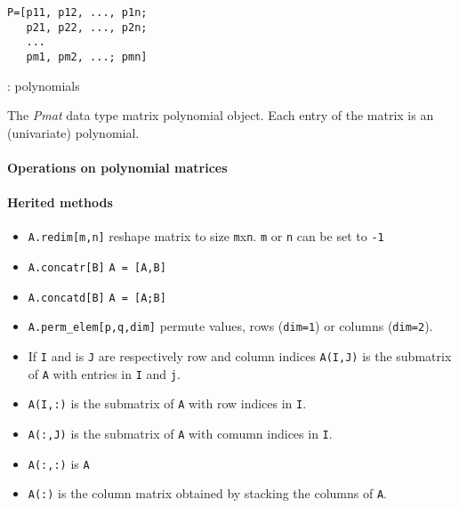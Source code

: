
\begin{mandesc}
\end{mandesc}
\begin{calling_sequence}
\begin{verbatim}
P=[p11, p12, ..., p1n;
   p21, p22, ..., p2n;
   ...
   pm1, pm2, ...; pmn]
\end{verbatim}
\end{calling_sequence}
\begin{parameters}
  \begin{varlist}
    : polynomials
  \end{varlist}
\end{parameters}

\begin{mandescription}
The \emph{Pmat} data type matrix polynomial object. 
Each entry of the matrix is an (univariate) polynomial.
\end{mandescription}

\paragraph{Operations on polynomial matrices}
\paragraph{Herited methods}
\begin{itemize}
\item \verb+A.redim[m,n]+ reshape matrix to size \verb+m+x\verb+n+. \verb+m+ or \verb+n+ can be set to \verb+-1+ 
\item \verb+A.concatr[B]+ \verb+A = [A,B]+
\item \verb+A.concatd[B]+ \verb+A = [A;B]+
\item \verb+A.perm_elem[p,q,dim]+ permute values, rows (\verb+dim=1+) or columns (\verb+dim=2+).
\end{itemize}

\begin{itemize}
   \item If \verb+I+ and is \verb+J+ are respectively row and column indices \verb+A(I,J)+ is the submatrix of \verb+A+ with entries in \verb+I+ and \verb+j+.
   \item \verb+A(I,:)+ is the submatrix of \verb+A+ with row indices in \verb+I+.
   \item \verb+A(:,J)+ is the submatrix of \verb+A+ with comumn indices in \verb+I+.
   \item \verb+A(:,:)+ is \verb+A+
   \item \verb+A(:)+  is the column matrix obtained by stacking the columns of \verb+A+.
\end{itemize}

